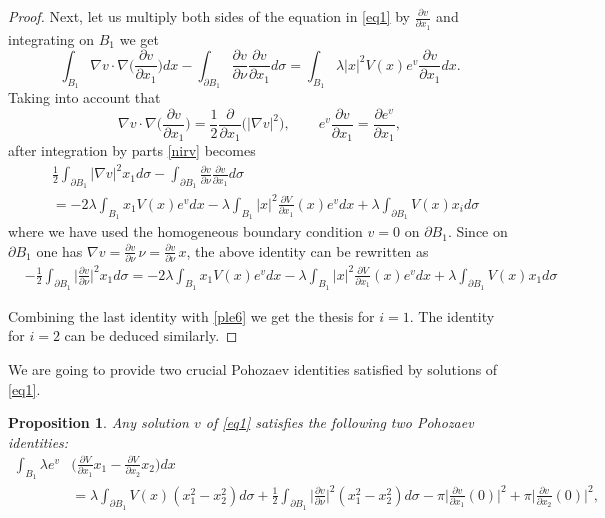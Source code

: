 \documentclass[reqno,11pt]{amsart}
\newtheorem{prop}[thm]{Proposition}
\theoremstyle{definition}
\numberwithin{equation}{section}
\newcommand{\la}{\lambda}
\renewcommand{\(}{\left(}
\renewcommand{\)}{\right)}
\renewcommand{\[}{\left[}
\renewcommand{\]}{\right]}
\newcommand{\beq}{\begin{equation}}
\newcommand{\eeq}{\end{equation}}
\begin{document}
{\begin{proof}
Next, let us multiply both sides of the equation in \eqref{eq1} by $\frac{\partial v}{\partial x_1}$   and integrating on $B_1$ we get
\beq\label{nirv}\int_{B_1}  \nabla v\cdot \nabla \bigg(\frac{\partial v}{\partial x_1}\bigg) dx-\int_{\partial B_1}\frac{\partial v}{\partial \nu}\frac{\partial v}{\partial x_1} d\sigma=\int_{B_1}\la |x|^{2} V(x) e^v\frac{\partial v}{\partial x_1} dx.\eeq
Taking into account that $$\nabla v\cdot \nabla \bigg(\frac{\partial v}{\partial x_1}\bigg) =\frac12\frac{\partial }{\partial x_1}\Big(|\nabla v|^2\Big), \qquad e^v\frac{\partial v}{\partial x_1} =\frac{\partial e^v}{\partial x_1} ,$$ 
after integration by parts  \eqref{nirv} becomes
$$\begin{aligned}&\frac12\int_{\partial B_1}|\nabla v|^2 x_1 d\sigma-\int_{\partial B_1}\frac{\partial v}{\partial \nu}\frac{\partial v}{\partial x_1} d\sigma
\\ &=-2\la\int_{B_1} x_1 V(x) e^vdx-\la\int_{B_1} |x|^{2} \frac{\partial V}{\partial x_1}(x) e^vdx+\la\int_{\partial B_1} V(x) x_i d\sigma\end{aligned}$$
where we have used the homogeneous boundary condition $v=0$ on $\partial B_1$. Since  on $\partial B_1$ one has $\nabla v=\frac{\partial v}{\partial \nu}\,\nu=\frac{\partial v}{\partial \nu}\,x$,   the above identity can be rewritten as 
$$\begin{aligned}&-\frac12\int_{\partial B_1}\bigg|\frac{\partial v}{\partial \nu}\bigg|^2x_1 d\sigma
=-2\la\int_{B_1} x_1 V(x) e^vdx-\la\int_{B_1} |x|^{2} \frac{\partial V}{\partial x_1}(x) e^vdx+\la\int_{\partial B_1} V(x) x_1 d\sigma\end{aligned}$$



Combining the last identity with \eqref{ple6}
 we get the thesis for $i=1$. The identity for $i=2$ can be deduced similarly.
\end{proof}


We are going to provide  two crucial Pohozaev identities satisfied by   solutions of \eqref{eq1}. 



\begin{prop}\label{propo2} Any solution  $v$ of \eqref{eq1} satisfies the following two Pohozaev identities:
$$\begin{aligned}\int_{B_1} \la e^{v}&\bigg(\frac{\partial V}{\partial x_1}x_1-\frac{\partial V}{\partial x_2}x_2\bigg) dx \\ &=\la\int_{\partial B_1}  V(x)(x_1^2-x_2^2)d\sigma+\frac12\int_{\partial B_1}\bigg|\frac{\partial v}{\partial \nu}\bigg|^2(x_1^2-x_2^2) d\sigma
-\pi\bigg|\frac{\partial v}{\partial x_1}(0)\bigg|^2+\pi\bigg|\frac{\partial v}{\partial x_2}(0)\bigg|^2,
\end{aligned}$$ 






\end{prop}}
\end{document}
